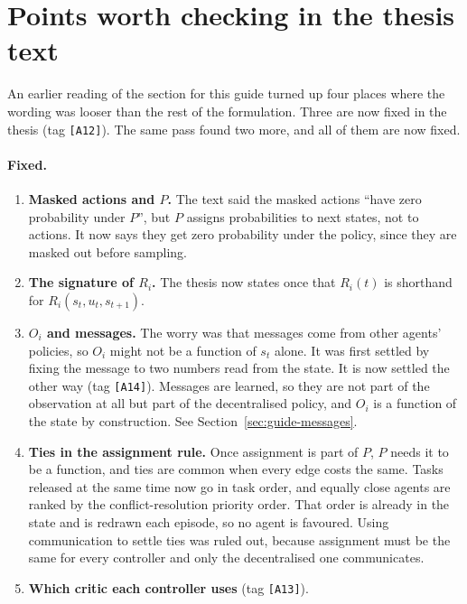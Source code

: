 \documentclass[11pt,a4paper]{article}
\begin{document}
\section{Points worth checking in the thesis text}

An earlier reading of the section for this guide turned up four places
where the wording was looser than the rest of the formulation. Three are
now fixed in the thesis (tag \texttt{[A12]}). The same pass found two
more, and all of them are now fixed.

\paragraph{Fixed.}
\begin{enumerate}[leftmargin=*]
  \item \textbf{Masked actions and $P$.} The text said the masked actions
        ``have zero probability under $P$'', but $P$ assigns probabilities
        to next states, not to actions. It now says they get zero
        probability under the policy, since they are masked out before
        sampling.
  \item \textbf{The signature of $R_i$.} The thesis now states once that
        $R_i(t)$ is shorthand for $R_i(s_t,u_t,s_{t+1})$.
  \item \textbf{$O_i$ and messages.} The worry was that messages come from
        other agents' policies, so $O_i$ might not be a function of $s_t$
        alone. It was first settled by fixing the message to two numbers
        read from the state. It is now settled the other way (tag
        \texttt{[A14]}). Messages are learned, so they are not part of the
        observation at all but part of the decentralised policy, and
        $O_i$ is a function of the state by construction. See
        Section~\ref{sec:guide-messages}.
  \item \textbf{Ties in the assignment rule.} Once assignment is part of
        $P$, $P$ needs it to be a function, and ties are common when every
        edge costs the same. Tasks released at the same time now go in task
        order, and equally close agents are ranked by the
        conflict-resolution priority order. That order is already in the
        state and is redrawn each episode, so no agent is favoured. Using
        communication to settle ties was ruled out, because assignment
        must be the same for every controller and only the decentralised
        one communicates.
  \item \textbf{Which critic each controller uses} (tag \texttt{[A13]}).

\end{enumerate}
\end{document}
